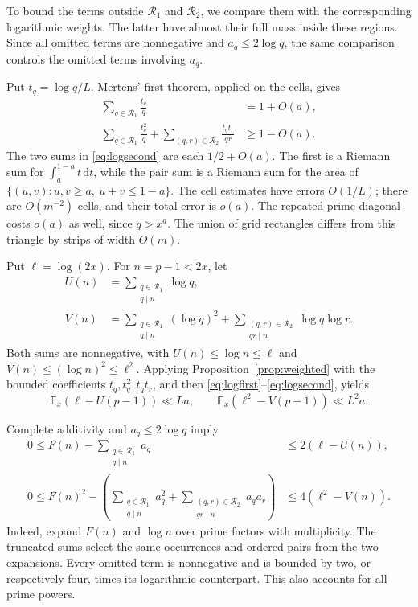\documentclass[10pt]{article}
\newcommand{\EE}{\mathbb E}
\newcommand{\calR}{\mathcal R}
\newcommand{\dd}{\,\mathrm d}
\begin{document}
To bound the terms outside $\calR_1$ and $\calR_2$, we compare them with the corresponding logarithmic weights. The latter have almost their full mass inside these regions. Since all omitted terms are nonnegative and $a_q\leq2\log q$, the same comparison controls the omitted terms involving $a_q$.

Put $t_q=\log q/L$. Mertens' first theorem, applied on the cells, gives
\begin{align}
 \sum_{q\in\calR_1}\frac{t_q}{q}&=1+O(a),\label{eq:logfirst}\\
 \sum_{q\in\calR_1}\frac{t_q^2}{q}
   +\sum_{(q,r)\in\calR_2}\frac{t_qt_r}{qr}&\geq1-O(a).
   \label{eq:logsecond}
\end{align}
The two sums in \eqref{eq:logsecond} are each $1/2+O(a)$. The first is a Riemann sum for $\int_a^{1-a}t\dd t$, while the pair sum is a Riemann sum for the area of $\{(u,v):u,v\geq a,\ u+v\leq1-a\}$. The cell estimates have errors $O(1/L)$; there are $O(m^{-2})$ cells, and their total error is $o(a)$. The repeated-prime diagonal costs $o(a)$ as well, since $q>x^a$. The union of grid rectangles differs from this triangle by strips of width $O(m)$.

Put $\ell=\log(2x)$. For $n=p-1<2x$, let
\begin{align*}
 U(n)&=\sum_{\substack{q\in\calR_1\\q\mid n}}\log q,\\
 V(n)&=\sum_{\substack{q\in\calR_1\\q\mid n}}(\log q)^2
    +\sum_{\substack{(q,r)\in\calR_2\\qr\mid n}}\log q\log r.
\end{align*}
Both sums are nonnegative, with $U(n)\leq\log n\leq\ell$ and $V(n)\leq(\log n)^2\leq\ell^2$. Applying Proposition~\ref{prop:weighted} with the bounded coefficients $t_q,t_q^2,t_qt_r$, and then \eqref{eq:logfirst}--\eqref{eq:logsecond}, yields
\begin{equation}\label{eq:logdefects}
 \EE_x(\ell-U(p-1))\ll La,\qquad
 \EE_x(\ell^2-V(p-1))\ll L^2a.
\end{equation}

Complete additivity and $a_q\leq2\log q$ imply
\begin{align}
 0\leq F(n)-\sum_{\substack{q\in\calR_1\\q\mid n}}a_q
       &\leq2(\ell-U(n)),\label{eq:Fdefect}\\
 0\leq F(n)^2-
 \left(\sum_{\substack{q\in\calR_1\\q\mid n}}a_q^2+
       \sum_{\substack{(q,r)\in\calR_2\\qr\mid n}}a_qa_r\right)
       &\leq4(\ell^2-V(n)).\label{eq:Fsqdefect}
\end{align}
Indeed, expand $F(n)$ and $\log n$ over prime factors with multiplicity. The truncated sums select the same occurrences and ordered pairs from the two expansions. Every omitted term is nonnegative and is bounded by two, or respectively four, times its logarithmic counterpart. This also accounts for all prime powers.
\end{document}
